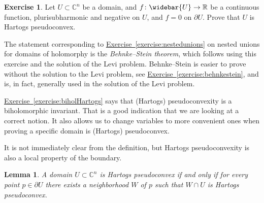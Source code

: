 \documentclass[12pt,openany]{book}
\newcommand{\C}{{\mathbb{C}}}
\newcommand{\R}{{\mathbb{R}}}
\newcommand{\myindex}[1]{#1\index{#1}}
\theoremstyle{plain}
\newtheorem{lemma}[thm]{Lemma}
\theoremstyle{remark}
\theoremstyle{definition}
\newenvironment{exbox}{%
    \def\FrameCommand{\vrule width 1pt \relax\hspace{10pt}}%
    \MakeFramed{\advance\hsize-\width\FrameRestore}%
}{%
    \endMakeFramed
}
\theoremstyle{exercise}
\newtheorem{exercise}{Exercise}[section]
\theoremstyle{example}
\newcommand{\exerciseref}[1]{\hyperref[#1]{Exercise~\ref*{#1}}}
\begin{document}
\begin{exbox}
\begin{exercise}
Let $U \subset \C^n$ be a domain, and $f \colon \widebar{U} \to \R$ be a
continuous function, plurisubharmonic and negative on $U$, and $f=0$ on $\partial
U$.  Prove that $U$ is Hartogs pseudoconvex.
\end{exercise}
\end{exbox}

The statement corresponding to \exerciseref{exercise:nestedunions} on nested unions
for domains of holomorphy is
the \emph{\myindex{Behnke--Stein theorem}}, which follows using this exercise and the solution
of the Levi problem.
Behnke--Stein is easier to prove without the solution to the Levi problem,
see \exerciseref{exercise:behnkestein}, and is, in fact, generally used in
the solution of the Levi problem.

\exerciseref{exercise:biholHartogs} says that (Hartogs) pseudoconvexity is a
biholomorphic invariant.  That is a good indication that we are looking at a
correct notion.  It also allows us to change variables to more convenient
ones when proving a specific domain is (Hartogs) pseudoconvex.

It is not immediately clear from the definition,
but Hartogs pseudoconvexity
is also a local property of the boundary.

\begin{lemma}
\pagebreak[2]
A domain $U \subset \C^n$ is Hartogs pseudoconvex if and only if
for every point $p \in \partial U$ there exists a neighborhood $W$ of $p$
such that $W \cap U$ is Hartogs pseudoconvex.
\end{lemma}
\end{document}
